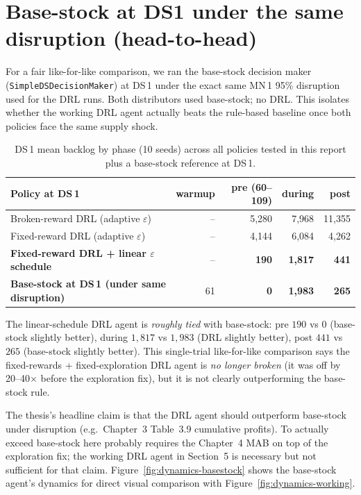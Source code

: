 \documentclass[11pt,letterpaper]{article}
\newcommand{\code}[1]{\texttt{\small #1}}
\begin{document}
\appendix

\section{Base-stock at DS1 under the same disruption (head-to-head)}

For a fair like-for-like comparison, we ran the base-stock decision maker
(\code{SimpleDSDecisionMaker}) at DS\,1 under the exact same MN\,1 95\%
disruption used for the DRL runs.  Both distributors used base-stock; no
DRL.  This isolates whether the working DRL agent actually beats the
rule-based baseline once both policies face the same supply shock.

\begin{table}[h!]\centering\small
\begin{tabular}{lrrrr}
\toprule
Policy at DS\,1 & warmup & \textbf{pre (60--109)} & during & post \\
\midrule
Broken-reward DRL (adaptive $\varepsilon$)           & --   & 5{,}280 & 7{,}968  & 11{,}355 \\
Fixed-reward DRL (adaptive $\varepsilon$)            & --   & 4{,}144 & 6{,}084  & 4{,}262 \\
\textbf{Fixed-reward DRL + linear $\varepsilon$ schedule} & --   & \textbf{190}   & \textbf{1{,}817}  & \textbf{441}   \\
\textbf{Base-stock at DS\,1 (under same disruption)} & 61 & \textbf{0}     & \textbf{1{,}983}  & \textbf{265}   \\
\bottomrule
\end{tabular}
\caption{DS\,1 mean backlog by phase (10 seeds) across all policies tested in
this report plus a base-stock reference at DS\,1.}
\label{tab:vs-basestock}
\end{table}

The linear-schedule DRL agent is \emph{roughly tied} with base-stock: pre
$190$ vs $0$ (base-stock slightly better), during $1{,}817$ vs $1{,}983$
(DRL slightly better), post $441$ vs $265$ (base-stock slightly better).  This
single-trial like-for-like comparison says the fixed-rewards + fixed-exploration
DRL agent is \emph{no longer broken} (it was off by 20--40$\times$ before
the exploration fix), but it is not clearly outperforming the base-stock rule.

The thesis's headline claim is that the DRL agent should outperform base-stock
under disruption (e.g.\ Chapter~3 Table~3.9 cumulative profits).  To actually
exceed base-stock here probably requires the Chapter~4 MAB on top of the
exploration fix; the working DRL agent in Section~5 is necessary but not
sufficient for that claim.  Figure~\ref{fig:dynamics-basestock} shows the
base-stock agent's dynamics for direct visual comparison with
Figure~\ref{fig:dynamics-working}.
\end{document}
